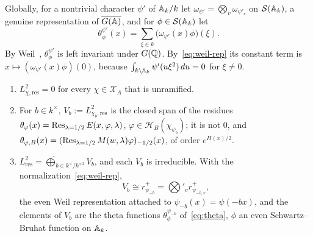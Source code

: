 Globally, for a nontrivial character $\psi'$ of $\mathbb{A}_k/k$ let
$\omega_{\psi'}=\bigotimes_v\omega_{\psi'_v}$ on $\mathcal S(\mathbb{A}_k)$, a
genuine representation of $\overline{G(\mathbb{A})}$, and for $\phi\in\mathcal S(\mathbb{A}_k)$ let
\begin{equation}\label{eq:theta}
\theta^{\psi'}_\phi(x)=\sum_{\xi\in k}\bigl(\omega_{\psi'}(x)\phi\bigr)(\xi).
\end{equation}
By Weil~\cite{We64}, $\theta^{\psi'}_\phi$ is left invariant under
$G(\mathbb{Q})$. By~\eqref{eq:weil-rep} its constant term is
$x\mapsto(\omega_{\psi'}(x)\phi)(0)$, because $\int_{k\backslash\mathbb{A}_k}
\psi'(u\xi^2)\,du=0$ for $\xi\ne0$.

\begin{theorem}\label{thm:residual}
\begin{enumerate}[label=(\alph*)]
\item $L^2_{\chi,\mathrm{res}}=0$ for every $\chi\in\mathcal X_A$ that is
  unramified.
\item For $b\in k^\times$, $V_b:=L^2_{\chi_b,\mathrm{res}}$ is the closed
  span of the residues $\theta_\varphi(x)=\operatorname{Res}_{\lambda=1/2}
  E(x,\varphi,\lambda)$, $\varphi\in\mathcal H_B(\chi_{\psi_b})$; it is
  not $0$, and $\theta_{\varphi,B}(x)=(\operatorname{Res}_{\lambda=1/2}
  M(w,\lambda)\varphi)_{-1/2}(x)$, of order $e^{H(x)/2}$.
\item $L^2_{\mathrm{res}}=\widehat\bigoplus_{b\in k^\times/k^{\times2}}V_b$,
  and each $V_b$ is irreducible. With the
  normalization~\eqref{eq:weil-rep},
  \[
  V_b\cong r^+_{\psi_{-b}}=\bigotimes\nolimits'_v r^+_{\psi_{-b,v}},
  \]
  the even Weil representation attached to $\psi_{-b}(x)=\psi(-bx)$, and
  the elements of $V_b$ are the theta functions
  $\theta^{\psi_{-b}}_\phi$ of~\eqref{eq:theta}, $\phi$ an even
  Schwartz--Bruhat function on $\mathbb{A}_k$.
\end{enumerate}
\end{theorem}

